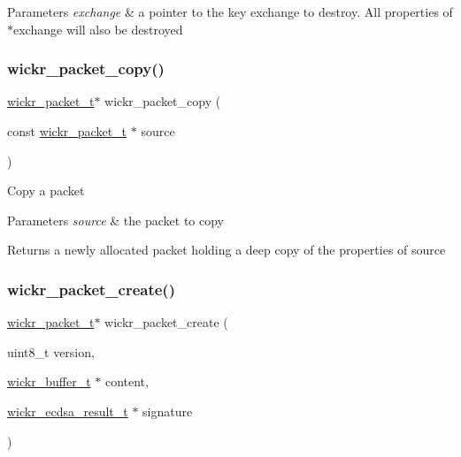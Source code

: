 \begin{DoxyParams}{Parameters}
{\em exchange} & a pointer to the key exchange to destroy. All properties of \textquotesingle{}$\ast$exchange\textquotesingle{} will also be destroyed \\
\hline
\end{DoxyParams}
\mbox{\label{group__wickr__protocol_ga0c95ad86819bacf98c11115d748039db}} 
\subsubsection{\texorpdfstring{wickr\+\_\+packet\+\_\+copy()}{wickr\_packet\_copy()}}
{\footnotesize\ttfamily \mbox{\hyperlink{structwickr__packet}{wickr\+\_\+packet\+\_\+t}}$\ast$ wickr\+\_\+packet\+\_\+copy (\begin{DoxyParamCaption}\item[{const \mbox{\hyperlink{structwickr__packet}{wickr\+\_\+packet\+\_\+t}} $\ast$}]{source }\end{DoxyParamCaption})}

Copy a packet


\begin{DoxyParams}{Parameters}
{\em source} & the packet to copy \\
\hline
\end{DoxyParams}
\begin{DoxyReturn}{Returns}
a newly allocated packet holding a deep copy of the properties of \textquotesingle{}source\textquotesingle{} 
\end{DoxyReturn}
\mbox{\label{group__wickr__protocol_gac952913ddaf848d2def181cd55b30883}} 
\subsubsection{\texorpdfstring{wickr\+\_\+packet\+\_\+create()}{wickr\_packet\_create()}}
{\footnotesize\ttfamily \mbox{\hyperlink{structwickr__packet}{wickr\+\_\+packet\+\_\+t}}$\ast$ wickr\+\_\+packet\+\_\+create (\begin{DoxyParamCaption}\item[{uint8\+\_\+t}]{version,  }\item[{\mbox{\hyperlink{structwickr__buffer}{wickr\+\_\+buffer\+\_\+t}} $\ast$}]{content,  }\item[{\mbox{\hyperlink{structwickr__ecdsa__result}{wickr\+\_\+ecdsa\+\_\+result\+\_\+t}} $\ast$}]{signature }\end{DoxyParamCaption})}

